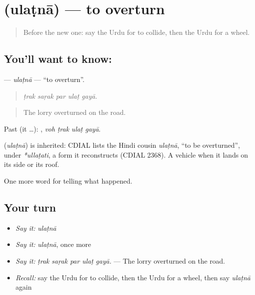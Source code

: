 \section[\texorpdfstring{\ur{الٹنا} (ulaṭnā)}{الٹنا (ulaṭnā)}]{ (ulaṭnā) — to overturn}

\label{lesson:UR-C284-ulatna}



\begin{quote}
Before the new one: say the Urdu for to collide, then the Urdu for a wheel.
\end{quote}

\subsection*{You'll want to know: }
\textbf{} — \emph{ulaṭnā} — \textquotedblleft{}to overturn\textquotedblright{}.

\begin{quote}
    
\end{quote}

\begin{quote}
\emph{ṭrak saṛak par ulaṭ gayā.}
\end{quote}

\begin{quote}
The lorry overturned on the road.
\end{quote}

Past (it …):    , \emph{voh ṭrak ulaṭ gayā}.

\begin{cousinweb}
\textbf{} (\emph{ulaṭnā}) is inherited: CDIAL lists the Hindi cousin \emph{ulaṭnā}, \textquotedblleft{}to be overturned\textquotedblright{}, under \emph{*ullaṭati}, a form it reconstructs (CDIAL 2368). A vehicle \textbf{ } when it lands on its side or its roof.
\end{cousinweb}

\begin{grammarlens}[title={What you've built}]
One more word for telling what happened.
\end{grammarlens}

\subsection*{Your turn}
\begin{itemize}
\raggedright
  \item \emph{Say it:} \emph{ulaṭnā}
  \item \emph{Say it:} \emph{ulaṭnā}, once more
  \item \emph{Say it:} \emph{ṭrak saṛak par ulaṭ gayā.} — The lorry overturned on the road.
  \item \emph{Recall:} say the Urdu for to collide, then the Urdu for a wheel, then say \emph{ulaṭnā} again
\end{itemize}

